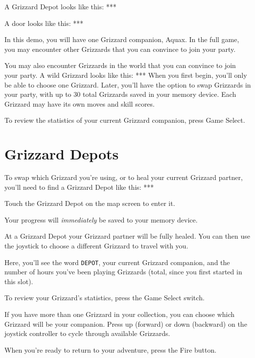 \documentclass[10pt,twocolumn,openany,article]{memoir}
\begin{document}
A Grizzard Depot looks like this: ***

A door looks like this: ***


\ifdefined\DEMO
In this demo,  you will have one Grizzard companion,  Aquax. In the full
game, you  may encounter other Grizzards  that you can convince  to join
your party.

\else

You may also  encounter Grizzards in the world that  you can convince to
join your  party. A wild  Grizzard looks like  this: *** When  you first
begin, you'll  only be able to  choose one Grizzard. Later,  you'll have
the  option  to swap  Grizzards  in  your party,  with  up  to 30  total
Grizzards saved  in your memory device.  Each Grizzard may have  its own
moves and skill scores.

\fi

To  review the  statistics  of your  current  Grizzard companion,  press
Game Select.

\section{Grizzard Depots}

To \ifdefined\DEMO\else  swap which  Grizzard you're using,  or to  \fi heal
your current Grizzard partner, you'll need to find a Grizzard Depot like
this: ***

Touch the Grizzard Depot on the map screen to enter it.

Your progress will \emph{immediately} be saved to your memory device.

At  a  Grizzard  Depot  your  Grizzard partner  will  be  fully  healed.
\ifdefined\DEMO\else You  can then  use the joystick  to choose  a different
Grizzard to travel with you. \fi

Here,  you'll  see  the   word  \texttt{DEPOT},  your  current  Grizzard
companion,  and  the  number  of hours  you've  been  playing  Grizzards
(total, since you first started in this slot).

To review your Grizzard's statistics, press the Game Select switch.

\ifdefined\DEMO\else
If you  have more than one  Grizzard in your collection,  you can choose
which  Grizzard will  be  your  companion. Press  up  (forward) or  down
(backward)  on  the  joystick  controller  to  cycle  through  available
Grizzards.
\fi

When you're ready to return to your adventure, press the Fire button.
\end{document}
